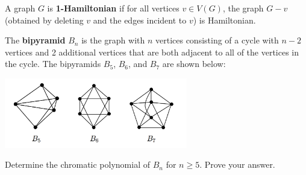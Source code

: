 \documentclass{exam}
\begin{document}
\begin{questions}

\question A graph $G$ is {\bf 1-Hamiltonian} if for all vertices $v\in V(G)$, the graph $G-v$ (obtained by deleting $v$ and the edges incident to $v$) is Hamiltonian.


\question[15] The {\bf bipyramid} $B_n$ is the graph with $n$ vertices consisting of a cycle with $n-2$ vertices and 2 additional vertices that are both adjacent to all of the vertices in the cycle. The bipyramids $B_5$, $B_6$, and $B_7$ are shown below:
		\begin{center}
			\includegraphics[width=0.6\textwidth]{finalpic2.png}
		\end{center}		
Determine the chromatic polynomial of $B_n$ for $n\geqslant 5$. Prove your answer.


\end{questions}
\end{document}
